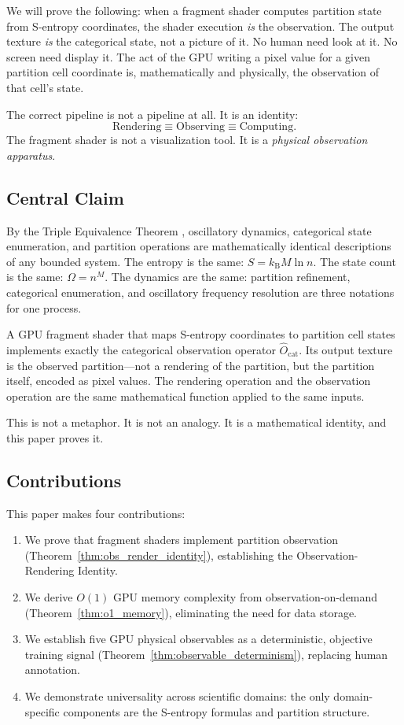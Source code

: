 \documentclass[11pt,twocolumn,a4paper]{article}
\theoremstyle{definition}
\theoremstyle{remark}
\newcommand{\kB}{k_{\mathrm{B}}}
\newcommand{\Ocat}{\hat{O}_{\mathrm{cat}}}
\begin{document}
We will prove the following: when a fragment shader computes partition state from S-entropy coordinates, the shader execution \emph{is} the observation. The output texture \emph{is} the categorical state, not a picture of it. No human need look at it. No screen need display it. The act of the GPU writing a pixel value for a given partition cell coordinate is, mathematically and physically, the observation of that cell's state.

The correct pipeline is not a pipeline at all. It is an identity:
\[
\text{Rendering} \equiv \text{Observing} \equiv \text{Computing}.
\]
The fragment shader is not a visualization tool. It is a \emph{physical observation apparatus}.

\subsection{Central Claim}
\label{sec:central_claim}

By the Triple Equivalence Theorem \citep{sachikonye2025a, sachikonye2025b}, oscillatory dynamics, categorical state enumeration, and partition operations are mathematically identical descriptions of any bounded system. The entropy is the same: $S = \kB M \ln n$. The state count is the same: $\Omega = n^M$. The dynamics are the same: partition refinement, categorical enumeration, and oscillatory frequency resolution are three notations for one process.

A GPU fragment shader that maps S-entropy coordinates to partition cell states implements exactly the categorical observation operator $\Ocat$. Its output texture is the observed partition---not a rendering of the partition, but the partition itself, encoded as pixel values. The rendering operation and the observation operation are the same mathematical function applied to the same inputs.

This is not a metaphor. It is not an analogy. It is a mathematical identity, and this paper proves it.

\subsection{Contributions}
\label{sec:contributions}

This paper makes four contributions:
\begin{enumerate}[nosep]
\item We prove that fragment shaders implement partition observation (Theorem~\ref{thm:obs_render_identity}), establishing the Observation-Rendering Identity.
\item We derive $O(1)$ GPU memory complexity from observation-on-demand (Theorem~\ref{thm:o1_memory}), eliminating the need for data storage.
\item We establish five GPU physical observables as a deterministic, objective training signal (Theorem~\ref{thm:observable_determinism}), replacing human annotation.
\item We demonstrate universality across scientific domains: the only domain-specific components are the S-entropy formulas and partition structure.
\end{enumerate}
\end{document}
